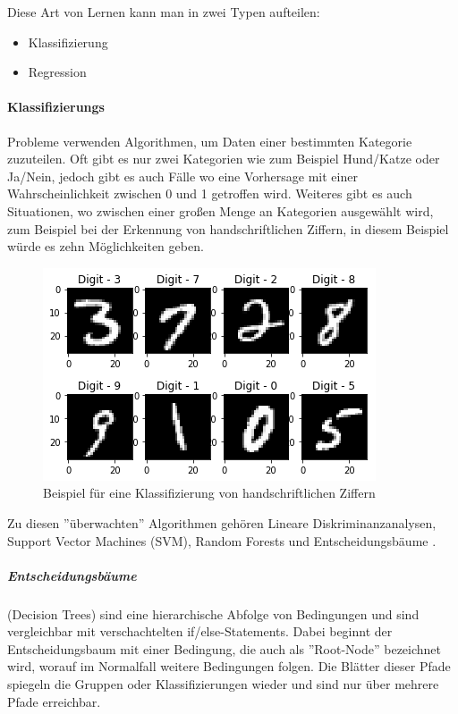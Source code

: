 Diese Art von Lernen kann man in zwei Typen aufteilen:

\begin{itemize}
    \item Klassifizierung
    \item Regression
\end{itemize}

\paragraph{Klassifizierungs} Probleme verwenden Algorithmen, um Daten einer bestimmten Kategorie zuzuteilen. Oft gibt es nur zwei Kategorien wie zum Beispiel Hund/Katze oder Ja/Nein, jedoch gibt es auch Fälle wo eine Vorhersage mit einer Wahrscheinlichkeit zwischen 0 und 1 getroffen wird. Weiteres gibt es auch Situationen, wo zwischen einer großen Menge an Kategorien ausgewählt wird, zum Beispiel bei der Erkennung von handschriftlichen Ziffern, in diesem Beispiel würde es zehn Möglichkeiten geben.

\begin{figure}[H]
    \centering
    \includegraphics{sections/machine-learning/images/0_8-vKSQnZvKbtKXKy.png}
    \caption{Beispiel für eine Klassifizierung von handschriftlichen Ziffern}
    \label{ziffern}
\end{figure}

Zu diesen ''überwachten'' Algorithmen gehören Lineare Diskriminanzanalysen, Support Vector Machines (SVM), Random Forests und Entscheidungsbäume \cite{SL:online}.

\subparagraph{Entscheidungsbäume} (Decision Trees) sind eine hierarchische Abfolge von Bedingungen und sind vergleichbar mit verschachtelten if/else-Statements. Dabei beginnt der Entscheidungsbaum mit einer Bedingung, die auch als ''Root-Node'' bezeichnet wird, worauf im Normalfall weitere Bedingungen folgen. Die Blätter dieser Pfade spiegeln die Gruppen oder Klassifizierungen wieder und sind nur über mehrere Pfade erreichbar.


